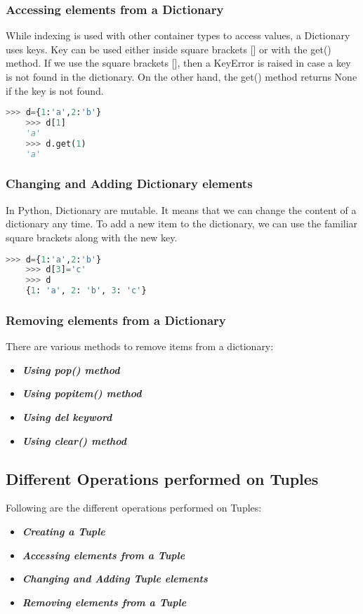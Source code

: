 \documentclass[11pt]{article}
\begin{document}
\subsubsection{Accessing elements from a Dictionary}
While indexing is used with other container types to access values, a Dictionary uses keys. Key can be used either inside square brackets [] or with the get() method. If we use the square brackets [], then a KeyError is raised in case a key is not found in the dictionary. On the other hand, the get() method returns None if the key is not found.
\begin{lstlisting}[language=Python]
	>>> d={1:'a',2:'b'}
	>>> d[1]
	'a'
	>>> d.get(1)
	'a'
\end{lstlisting}

\subsubsection{Changing and Adding Dictionary elements}
In Python, Dictionary are mutable. It means that we can change the content of a dictionary any time. To add a new item to the dictionary, we can use the familiar square brackets along with the new key.
\begin{lstlisting}[language=Python]
	>>> d={1:'a',2:'b'}
	>>> d[3]='c'
	>>> d
	{1: 'a', 2: 'b', 3: 'c'}
\end{lstlisting}

\subsubsection{Removing elements from a Dictionary}
There are various methods to remove items from a dictionary:
\begin{itemize}
	\item \textbf{\textit{Using pop() method}}
	\item \textbf{\textit{Using popitem() method}}
	\item \textbf{\textit{Using del keyword}}
	\item \textbf{\textit{Using clear() method}}
\end{itemize}

\subsection{Different Operations performed on Tuples}
Following are the different operations performed on Tuples:

\begin{itemize}
	\item \textbf{\textit{Creating a Tuple}}
	\item \textbf{\textit{Accessing elements from a Tuple}}
	\item \textbf{\textit{Changing and Adding Tuple elements}}
	\item \textbf{\textit{Removing elements from a Tuple}}
\end{itemize}
\end{document}
